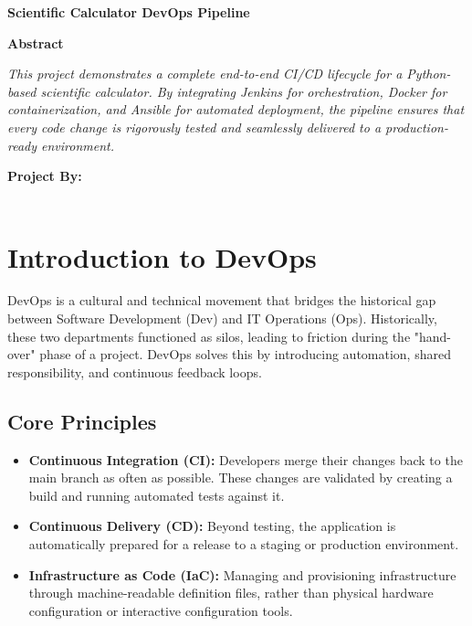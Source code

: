 \documentclass[12pt]{article}
\begin{document}
\begin{titlepage}
    \centering
    \vspace*{4cm}
    
    {\Huge \textbf{Scientific Calculator DevOps Pipeline}} \\
    \vspace{2cm}
    
    {\large \textbf{Abstract}} \\
    \vspace{0.5cm}
    \begin{minipage}{0.8\textwidth}
        \centering
        \textit{This project demonstrates a complete end-to-end CI/CD lifecycle for a Python-based scientific calculator. By integrating Jenkins for orchestration, Docker for containerization, and Ansible for automated deployment, the pipeline ensures that every code change is rigorously tested and seamlessly delivered to a production-ready environment.}
    \end{minipage}
    
    \vfill
    
    \begin{flushright}
        \large
        \textbf{Project By:} \\
        [Your Name] \\
        [Your Roll Number]
    \end{flushright}
\end{titlepage}

\newpage
\tableofcontents
\newpage

\section{Introduction to DevOps}
DevOps is a cultural and technical movement that bridges the historical gap between Software Development (Dev) and IT Operations (Ops). Historically, these two departments functioned as silos, leading to friction during the "hand-over" phase of a project. DevOps solves this by introducing automation, shared responsibility, and continuous feedback loops.

\subsection{Core Principles}
\begin{itemize}
    \item \textbf{Continuous Integration (CI):} Developers merge their changes back to the main branch as often as possible. These changes are validated by creating a build and running automated tests against it.
    \item \textbf{Continuous Delivery (CD):} Beyond testing, the application is automatically prepared for a release to a staging or production environment.
    \item \textbf{Infrastructure as Code (IaC):} Managing and provisioning infrastructure through machine-readable definition files, rather than physical hardware configuration or interactive configuration tools.
\end{itemize}
\end{document}
